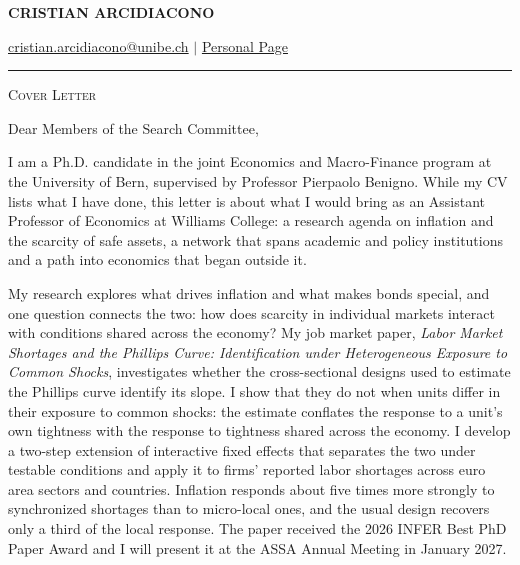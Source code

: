 \documentclass[11pt]{article}
\begin{document}
 
\begin{center}
    \textbf{\large \scshape CRISTIAN ARCIDIACONO}
\end{center}

\begin{center}
    {\href{mailto:cristian.arcidiacono@unibe.ch}{cristian.arcidiacono@unibe.ch} $\vert$ \href{https://sites.google.com/view/cristian-arcidiacono/home}{Personal Page}}
\end{center}
\vspace{-0.2cm}
\noindent\rule{\textwidth}{0.4pt}

\vspace{0.2cm}

\begin{center}
    {\large \scshape Cover Letter}
\end{center}

\vspace{0.3cm}

Dear Members of the Search Committee,

I am a Ph.D. candidate in the joint Economics and Macro-Finance program at the University of Bern, supervised by Professor Pierpaolo Benigno. While my CV lists what I have done, this letter is about what I would bring as an Assistant Professor of Economics at Williams College: a research agenda on inflation and the scarcity of safe assets, a network that spans academic and policy institutions and a path into economics that began outside it.

My research explores what drives inflation and what makes bonds special, and one question connects the two: how does scarcity in individual markets interact with conditions shared across the economy? My job market paper, \textit{Labor Market Shortages and the Phillips Curve: Identification under Heterogeneous Exposure to Common Shocks}, investigates whether the cross-sectional designs used to estimate the Phillips curve identify its slope. I show that they do not when units differ in their exposure to common shocks: the estimate conflates the response to a unit's own tightness with the response to tightness shared across the economy. I develop a two-step extension of interactive fixed effects that separates the two under testable conditions and apply it to firms' reported labor shortages across euro area sectors and countries. Inflation responds about five times more strongly to synchronized shortages than to micro-local ones, and the usual design recovers only a third of the local response. The paper received the 2026 INFER Best PhD Paper Award and I will present it at the ASSA Annual Meeting in January 2027.
\end{document}
